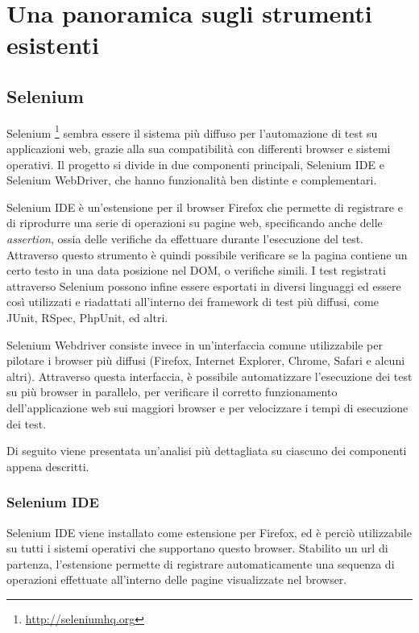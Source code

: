 \chapter{Una panoramica sugli strumenti esistenti}

\section{Selenium}

Selenium \footnote{\url{http://seleniumhq.org}}  sembra essere il sistema più diffuso per l'automazione di test su applicazioni web, grazie alla sua compatibilità con differenti browser e sistemi operativi.
Il progetto si divide in due componenti principali, Selenium IDE e Selenium WebDriver, che hanno funzionalità ben distinte e complementari. 

Selenium IDE è un'estensione per il browser Firefox che permette di registrare e di riprodurre una serie di operazioni su pagine web, specificando anche delle \emph{assertion}, ossia delle verifiche da effettuare durante l'esecuzione del test. Attraverso questo strumento è quindi possibile verificare se la pagina contiene un certo testo in una data posizione nel DOM, o verifiche simili. I test registrati attraverso Selenium possono infine essere esportati in diversi linguaggi ed essere così utilizzati e riadattati all'interno dei framework di test più diffusi, come JUnit, RSpec, PhpUnit, ed altri.

Selenium Webdriver consiste invece in un'interfaccia comune utilizzabile per pilotare i browser più diffusi (Firefox, Internet Explorer, Chrome, Safari e alcuni altri). Attraverso questa interfaccia, è possibile automatizzare l'esecuzione dei test su più browser in parallelo, per verificare il corretto funzionamento dell'applicazione web sui maggiori browser e per velocizzare i tempi di esecuzione dei test.

Di seguito viene presentata un'analisi più dettagliata su ciascuno dei componenti appena descritti.

\subsection{Selenium IDE}

Selenium IDE viene installato come estensione per Firefox,  ed è perciò utilizzabile su tutti i sistemi operativi che supportano questo browser. Stabilito un url di partenza, l'estensione permette di registrare automaticamente una sequenza di operazioni effettuate all'interno delle pagine visualizzate nel browser. 

